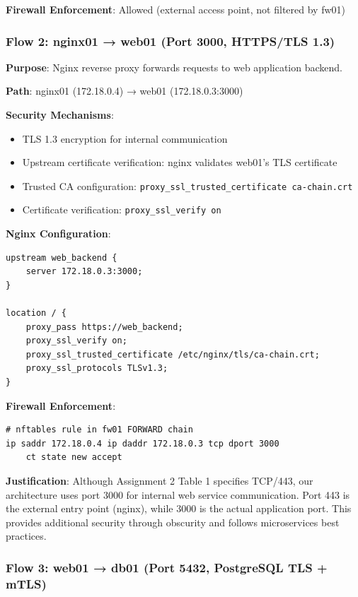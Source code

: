 \textbf{Firewall Enforcement}: Allowed (external access point, not filtered by fw01)

\subsubsection{Flow 2: nginx01 → web01 (Port 3000, HTTPS/TLS 1.3)}

\textbf{Purpose}: Nginx reverse proxy forwards requests to web application backend.

\textbf{Path}: nginx01 (172.18.0.4) → web01 (172.18.0.3:3000)

\textbf{Security Mechanisms}:
\begin{itemize}
    \item TLS 1.3 encryption for internal communication
    \item Upstream certificate verification: nginx validates web01's TLS certificate
    \item Trusted CA configuration: \texttt{proxy\_ssl\_trusted\_certificate ca-chain.crt}
    \item Certificate verification: \texttt{proxy\_ssl\_verify on}
\end{itemize}

\textbf{Nginx Configuration}:
\begin{verbatim}
upstream web_backend {
    server 172.18.0.3:3000;
}

location / {
    proxy_pass https://web_backend;
    proxy_ssl_verify on;
    proxy_ssl_trusted_certificate /etc/nginx/tls/ca-chain.crt;
    proxy_ssl_protocols TLSv1.3;
}
\end{verbatim}

\textbf{Firewall Enforcement}: 
\begin{verbatim}
# nftables rule in fw01 FORWARD chain
ip saddr 172.18.0.4 ip daddr 172.18.0.3 tcp dport 3000 
    ct state new accept
\end{verbatim}

\textbf{Justification}: Although Assignment 2 Table 1 specifies TCP/443, our architecture uses port 3000 for internal web service communication. Port 443 is the external entry point (nginx), while 3000 is the actual application port. This provides additional security through obscurity and follows microservices best practices.

\subsubsection{Flow 3: web01 → db01 (Port 5432, PostgreSQL TLS + mTLS)}

